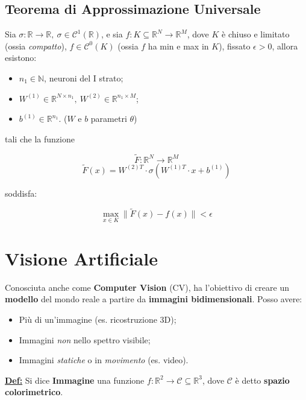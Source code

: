 \documentclass[a4paper,12pt]{article}
\newcommand{\definizione}{\noindent\textbf{\underline{Def:}} }
\begin{document}
	\subsection{Teorema di Approssimazione Universale}

	Sia $ \sigma : \mathbb{R} \rightarrow \mathbb{R},\  \sigma \in \mathcal{C}^1(\mathbb{R})$, e sia $f : K \subseteq \mathbb{R}^N \rightarrow \mathbb{R}^M$, dove $K$ è chiuso e limitato (ossia \textit{compatto}), $f \in \mathcal{C}^0(K)$ (ossia $f$ ha min e max in $K$), fissato $\epsilon > 0$, allora esistono:

	\begin{itemize}
		\item $n_1 \in \mathbb{N}$, neuroni del I strato;
		\item $W^{(1)} \in \mathbb{R}^{N \times n_1}, \ W^{(2)} \in \mathbb{R}^{n_1 \times M} $;
		\item $b^{(1)} \in \mathbb{R}^{n_1}$. ($W$ e $b$ parametri $\theta$)
	\end{itemize}

	tali che la funzione

	\[
	\tilde{F} : \mathbb{R}^N \rightarrow \mathbb{R}^M
	\]
	\[
	\tilde{F} (x) = W^{(2) T} \cdot \sigma ( W^{(1) T} \cdot x + b^{(1)})
	\]

	soddisfa:

	\[
	\max_{x \in K} \| \tilde{F} (x) - f(x) \| < \epsilon
	\]

	\section{Visione Artificiale}

	Conosciuta anche come \textbf{Computer Vision} (CV), ha l'obiettivo di creare un \textbf{modello} del mondo reale a partire da \textbf{immagini bidimensionali}. Posso avere:

	\begin{itemize}
		\item Più di un'immagine (es. ricostruzione 3D);
		\item Immagini \textit{non} nello spettro visibile;
		\item Immagini \textit{statiche} o in \textit{movimento} (es. video).
	\end{itemize}

	\definizione Si dice \textbf{Immagine} una funzione $f : \mathbb{R}^2 \rightarrow \mathcal{C} \subseteq \mathbb{R}^3$, dove $\mathcal{C}$ è detto \textbf{spazio colorimetrico}.
\end{document}
